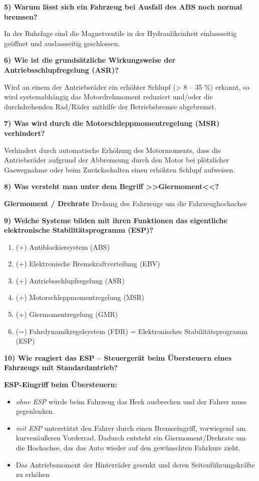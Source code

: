 \textbf{5) Warum lässt sich ein Fahrzeug bei Ausfall des ABS noch normal
bremsen?}

In der Ruhelage sind die Magnetventile in der Hydraulikeinheit
einlassseitig geöffnet und auslassseitig geschlossen.

\textbf{6) Wie ist die grundsätzliche Wirkungsweise der
Antriebsschlupfregelung (ASR)?}

Wird an einem der Antriebsräder ein erhöhter Schlupf (> 8
-- 35 \%) erkannt, so wird systemabhängig das Motordrehmoment reduziert
und/oder die durchdrehenden Rad/Räder mithilfe der Betriebsbremse
abgebremst.

\textbf{7) Was wird durch die Motorschleppmomentregelung (MSR)
verhindert?}

Verhindert durch automatische Erhöhung des Motormoments, dass die
Antriebsräder aufgrund der Abbremsung durch den Motor bei plötzlicher
Gaswegnahme oder beim Zurückschalten einen erhöhten Schlupf aufweisen.

\textbf{8) Was versteht man unter dem Begriff >>Giermoment<<?}

\textbf{Giermoment / Drehrate} Drehung des Fahrzeugs um die
Fahrzeughochachse

\textbf{9) Welche Systeme bilden mit ihren Funktionen das eigentliche
elektronische Stabilitätsprogramm (ESP)?}

\begin{enumerate}
\item
  (+) Antiblockiersystem (ABS)
\item
  (+) Elektronische Bremskraftverteilung (EBV)
\item
  (+) Antriebsschlupfregelung (ASR)
\item
  (+) Motorschleppmomentregelung (MSR)
\item
  (+) Giermomentregelung (GMR)
\item
  (=) Fahrdynamikregelsystem (FDR) = Elektronisches Stabilitätsprogramm
  (ESP)
\end{enumerate}

\textbf{10) Wie reagiert das ESP -- Steuergerät beim Übersteuern eines
Fahrzeugs mit Standardantrieb?}

\textbf{ESP-Eingriff beim Übersteuern:}

\begin{itemize}
\item
  \emph{ohne ESP} würde beim Fahrzeug das Heck ausbrechen und der Fahrer
  muss gegenlenken.
\item
  \emph{mit ESP} unterstützt den Fahrer durch einen Bremseingriff,
  vorwiegend am kurvenäußeren Vorderrad. Dadurch entsteht ein
  Giermoment/Drehrate um die Hochachse, das das Auto wieder auf den
  gewünschten Fahrkurs zieht.
\item
  Das Antriebsmoment der Hinterräder gesenkt und deren
  Seitenführungskräfte zu erhöhen
\end{itemize}

